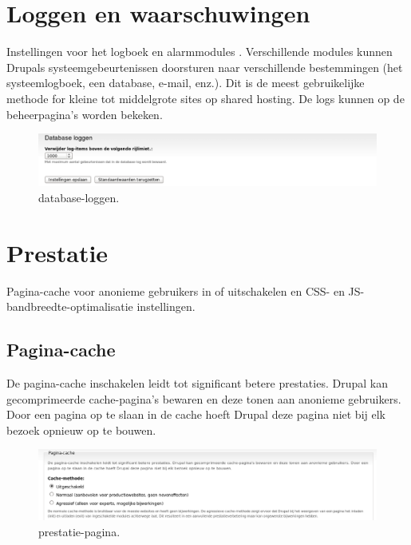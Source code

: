     
\section{Loggen  en waarschuwingen } 
    Instellingen voor het logboek  en alarmmodules
    . Verschillende modules kunnen Drupals
    systeemgebeurtenissen doorsturen naar verschillende bestemmingen (het systeemlogboek, een database, e-mail, enz.). Dit is de meest gebruikelijke methode for kleine
    tot middelgrote sites op shared hosting. De logs kunnen op de beheerpagina's worden bekeken.
\begin{figure}[!h]
    \centering
   \includegraphics[scale=0.3,angle=0]{database-loggen}
   \caption{database-loggen.\label{white}}
 \end{figure}       
    
    
\section{Prestatie} 
    Pagina-cache voor anonieme gebruikers in of uitschakelen en CSS- en JS-bandbreedte-optimalisatie instellingen.
\subsection{Pagina-cache}  
De pagina-cache inschakelen leidt tot significant betere prestaties. Drupal kan
  gecomprimeerde cache-pagina's bewaren en deze tonen aan anonieme gebruikers. Door een pagina op te slaan in de 
  cache hoeft Drupal deze pagina niet bij elk bezoek opnieuw op te bouwen.
\begin{figure}[!h]
    \centering
   \includegraphics[scale=0.3,angle=0]{prestatie-pagina}
   \caption{prestatie-pagina.\label{white}}
 \end{figure} 
